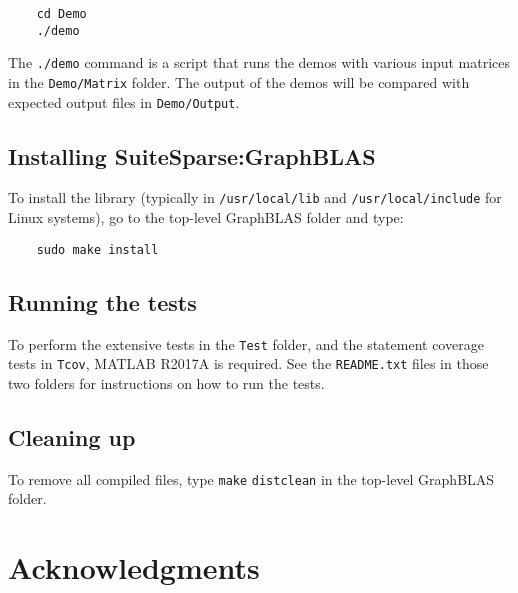 \documentclass[12pt]{article}
\begin{document}
    {\small
    \begin{verbatim}
    cd Demo
    ./demo \end{verbatim} }

The \verb'./demo' command is a script that runs the demos with various input
matrices in the \verb'Demo/Matrix' folder.  The output of the demos will be
compared with expected output files in \verb'Demo/Output'.

\subsection{Installing SuiteSparse:GraphBLAS}

To install the library (typically in \verb'/usr/local/lib' and
\verb'/usr/local/include' for Linux systems), go to the top-level GraphBLAS
folder and type:

    {\small
    \begin{verbatim}
    sudo make install \end{verbatim} }

\subsection{Running the tests}

To perform the extensive tests in the \verb'Test' folder, and the statement
coverage tests in \verb'Tcov', MATLAB R2017A is required.  See the
\verb'README.txt' files in those two folders for instructions on how to run the
tests.

\subsection{Cleaning up}

To remove all compiled files, type \verb'make' \verb'distclean' in the top-level
GraphBLAS folder.

\newpage
\section{Acknowledgments}
\end{document}
